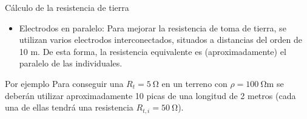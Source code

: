 \documentclass[xcolor={usenames,svgnames,dvipsnames}]{beamer}
\begin{document}
\begin{frame}[label={sec:org1340a4d}]{Cálculo de la resistencia de tierra}
\begin{itemize}
\item \alert{Electrodos en paralelo}: Para mejorar la resistencia de toma de
tierra, se utilizan varios electrodos interconectados, situados a
distancias del orden de 10 m. De esta forma, \alert{la resistencia
equivalente es (aproximadamente) el paralelo de las individuales}.
\end{itemize}

\begin{block}{Por ejemplo}
Para conseguir una \(R_{t}=\SI{5}{\ohm}\) en un terreno con
\(\rho=\SI{100}{\ohm\meter}\) se deberán utilizar aproximadamente 10
picas de una longitud de 2 metros (cada una de ellas tendrá una
resistencia \(R_{t,i}=\SI{50}{\ohm}\)).
\end{block}
\end{frame}
\end{document}
